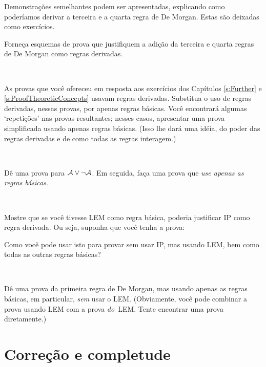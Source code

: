 Demonstra\c c\~oes semelhantes podem ser apresentadas, explicando como poder\'iamos derivar a terceira e a quarta regra de De Morgan. Estas s\~ao deixadas como exerc\'icios.

\practiceproblems

\problempart
Forne\c ca esquemas de prova que justifiquem a adi\c c\~ao da terceira e quarta regras de De Morgan como regras derivadas.

\

\problempart
As provas que voc\^e ofereceu em resposta aos exerc\'icios dos Capítulos  \ref{s:Further} e \ref{s:ProofTheoreticConcepts} usavam regras derivadas. Substitua o uso de regras derivadas, nessas provas, por apenas regras b\'asicas. Voc\^e encontrar\'a algumas `repeti\c c\~oes' nas provas resultantes; nesses casos, apresentar uma prova simplificada usando apenas regras b\'asicas. (Isso lhe dar\'a uma id\'eia, do poder das regras derivadas e de como todas as regras interagem.)

\

\problempart
D\^e uma prova para $\mathcal{A} \vee \neg\mathcal{A}$. Em seguida, fa\c ca uma prova que \emph{use apenas as regras b\'asicas}.

\

\problempart
Mostre que se voc\^e tivesse LEM como regra b\'asica, poderia justificar IP como regra derivada. Ou seja, suponha que voc\^e tenha a prova:
\begin{fitchproof}
  \open
  \close
\end{fitchproof}
Como voc\^e pode usar isto para provar  sem usar IP, mas usando
LEM, bem como todas as outras regras b\'asicas?

\

\problempart
D\^e uma prova da primeira regra de De Morgan, mas usando apenas as regras b\'asicas, em particular,  \emph{sem} usar o LEM. (Obviamente, voc\^e pode combinar a prova usando LEM com a prova  \emph{do}~LEM. Tente encontrar uma prova diretamente.)


\chapter{Corre\c c\~ao e completude}
\label{sec:soundness_and_completeness}

